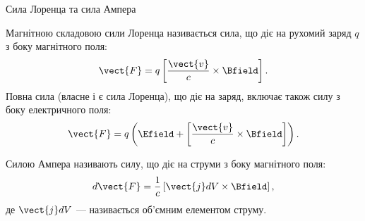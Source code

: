 \documentclass{beamer}
\begin{document}
\begin{frame}{Сила Лоренца та сила Ампера}{}
	\begin{block}{}
		Магнітною складовою сили Лоренца називається сила, що діє на рухомий заряд $q$ з боку магнітного поля:
		\begin{equation*}
			\vect{F} = q\left[\frac{\vect{v}}{c}\times\Bfield\right].
		\end{equation*}
		Повна сила (власне і є сила Лоренца), що діє на заряд, включає також силу з боку електричного поля:
		\begin{equation*}
			\vect{F} = q\left( \Efield + \left[\frac{\vect{v}}{c}\times\Bfield\right] \right) .
		\end{equation*}
	\end{block}
	\begin{block}{}
		\alert{Силою Ампера} називають силу, що діє на струми з боку магнітного поля:
		\begin{equation*}
			d\vect{F} = \frac1c \left[ \vect{j}dV \times \Bfield\right],
		\end{equation*}
		де $\vect{j} dV$ --- називається об'ємним \alert{елементом струму}.
	\end{block}
\end{frame}
\end{document}

